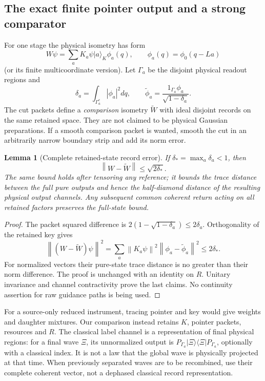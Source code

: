 \documentclass[11pt]{article}
\newtheorem{lemma}[theorem]{Lemma}
\theoremstyle{definition}\newtheorem{assumption}[theorem]{Constitutive assumption}
\theoremstyle{remark}\newtheorem{remark}[theorem]{Remark}
\newcommand{\ket}[1]{|#1\rangle}\newcommand{\bra}[1]{\langle#1|}
\newcommand{\norm}[1]{\left\|#1\right\|}\newcommand{\pos}[1]{[#1]_+}
\begin{document}
\subsection{The exact finite pointer output and a strong comparator}
For one stage the physical isometry has form
\begin{equation}\label{eq:W}
 W\psi=\sum_a K_a\psi\ket a_K\phi_a(q),
 \qquad\phi_a(q)=\phi_0(q-La)
\end{equation}
(or its finite multicoordinate version). Let $\Gamma_a$ be the disjoint physical readout regions and
\[
 \delta_a=\int_{\Gamma_a^c}|\phi_a|^2dq,\qquad
 \widetilde\phi_a=\frac{1_{\Gamma_a}\phi_a}{\sqrt{1-\delta_a}}.
\]
The cut packets define a \emph{comparison} isometry $\widetilde W$ with ideal disjoint records on the same retained space. They are not claimed to be physical Gaussian preparations. If a smooth comparison packet is wanted, smooth the cut in an arbitrarily narrow boundary strip and add its norm error.

\begin{lemma}[Complete retained-state record error]\label{lem:instrument}
If $\delta_* =\max_a\delta_a<1$, then
\begin{equation}\label{eq:isometryerror}
 \norm{W-\widetilde W}\le\sqrt{2\delta_*}.
\end{equation}
The same bound holds after tensoring any reference; it bounds the trace distance between the full pure outputs and hence the half-diamond distance of the resulting physical output channels. Any subsequent \emph{common} coherent return acting on all retained factors preserves the full-state bound.
\end{lemma}
\begin{proof}
The packet squared difference is $2(1-\sqrt{1-\delta_a})\le2\delta_a$. Orthogonality of the retained key gives
\[
 \norm{(W-\widetilde W)\psi}^2
 =\sum_a\norm{K_a\psi}^2\norm{\phi_a-\widetilde\phi_a}^2\le2\delta_*.
\]
For normalized vectors their pure-state trace distance is no greater than their norm difference. The proof is unchanged with an identity on $R$. Unitary invariance and channel contractivity prove the last claims. No continuity assertion for raw guidance paths is being used.
\end{proof}

For a source-only reduced instrument, tracing pointer and key would give weights and daughter mixtures. Our comparison instead retains $K$, pointer packets, resources and $R$. The classical label channel is a representation of final physical regions: for a final wave $\Xi$, its unnormalized output is $P_{\Gamma_a}\ket\Xi\bra\Xi P_{\Gamma_a}$, optionally with a classical index. It is not a law that the global wave is physically projected at that time. When previously separated waves are to be recombined, use their complete coherent vector, not a dephased classical record representation.
\end{document}
